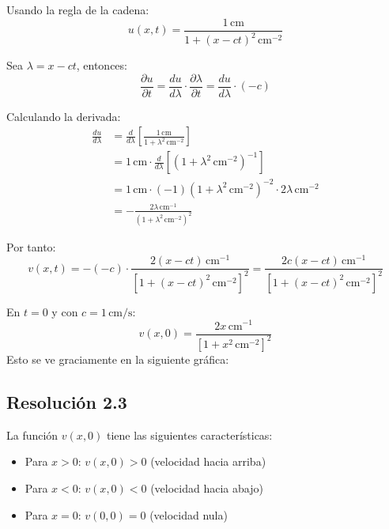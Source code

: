 \documentclass[
  11pt,
  letterpaper,
   addpoints,
  ]{exam}
\begin{document}
\begin{questions}
\begin{solution}
  Usando la regla de la cadena:
  \begin{equation}
    u(x,t) = \frac{1\,\mathrm{cm}}{1 + (x-ct)^2\,\mathrm{cm}^{-2}}
  \end{equation}
  
  Sea $\lambda = x - ct$, entonces:
  \begin{equation}
    \frac{\partial u}{\partial t} = \frac{du}{d\lambda} \cdot \frac{\partial \lambda}{\partial t} = \frac{du}{d\lambda} \cdot (-c)
  \end{equation}
  
  Calculando la derivada:
  \begin{align}
    \frac{du}{d\lambda} &= \frac{d}{d\lambda}\left[\frac{1\,\mathrm{cm}}{1 + \lambda^2\,\mathrm{cm}^{-2}}\right] \\
    &= 1\,\mathrm{cm} \cdot \frac{d}{d\lambda}\left[(1 + \lambda^2\,\mathrm{cm}^{-2})^{-1}\right] \\
    &= 1\,\mathrm{cm} \cdot (-1)(1 + \lambda^2\,\mathrm{cm}^{-2})^{-2} \cdot 2\lambda\,\mathrm{cm}^{-2} \\
    &= -\frac{2\lambda\,\mathrm{cm}^{-1}}{(1 + \lambda^2\,\mathrm{cm}^{-2})^2}
  \end{align}
  
  Por tanto:
  \begin{equation}
    v(x,t) = -(-c) \cdot \frac{2(x-ct)\,\mathrm{cm}^{-1}}{[1 + (x-ct)^2\,\mathrm{cm}^{-2}]^2} = \frac{2c(x-ct)\,\mathrm{cm}^{-1}}{[1 + (x-ct)^2\,\mathrm{cm}^{-2}]^2}
  \end{equation}
  
  En $t = 0$ y con $c = 1\,\mathrm{cm/s}$:
  \begin{equation}
    v(x,0) = \frac{2x\,\mathrm{cm}^{-1}}{[1 + x^2\,\mathrm{cm}^{-2}]^2}
  \end{equation}
  Esto se ve graciamente en la siguiente gráfica:

  \subsection*{Resolución 2.3}
  
  La función $v(x,0)$ tiene las siguientes características:
  
  \begin{itemize}
    \item Para $x > 0$: $v(x,0) > 0$ (velocidad hacia arriba)
    \item Para $x < 0$: $v(x,0) < 0$ (velocidad hacia abajo)  
    \item Para $x = 0$: $v(0,0) = 0$ (velocidad nula)
  \end{itemize}
  

\end{solution}
\end{questions}
\end{document}
